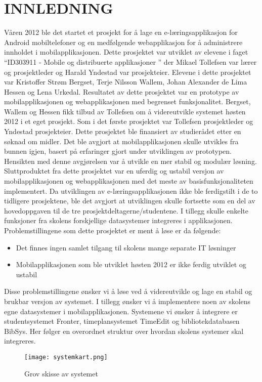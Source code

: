 \documentclass[../main.tex]{subfiles}
\begin{document}
\chapter{INNLEDNING}

Våren 2012 ble det startet et prosjekt for å lage en e-læringsapplikasjon for Android mobiltelefoner og en medfølgende webapplikasjon for å administrere innholdet i mobilapplikasjonen. Dette prosjektet var utviklet av elevene i faget “ID303911 - Mobile og distribuerte applikasjoner ” der Mikael Tollefsen var lærer og prosjektleder og Harald Yndestad var prosjekteier. Elevene i dette prosjektet var Kristoffer Strøm Bergset, Terje Nilsson Wallem, Johan Alexander de Lima Hessen og Lena Urkedal. Resultatet av dette prosjektet var en prototype av mobilapplikasjonen og webapplikasjonen med begrenset funksjonalitet.\newline
\newline
Bergset, Wallem og Hessen fikk tilbud av Tollefsen om å videreutvikle systemet høsten 2012 i et eget prosjekt. Som i det første prosjektet var Tollefsen prosjektleder og Yndestad prosjekteier. Dette prosjektet ble finansiert av studierådet etter en søknad om midler. Det ble avgjort at mobilapplikasjonen skulle utvikles fra bunnen igjen, basert på erfaringer gjort under utviklingen av prototypen. Hensikten med denne avgjørelsen var å utvikle en mer stabil og modulær løsning. Sluttproduktet fra dette prosjektet var en uferdig og ustabil versjon av mobilapplikasjonen og webapplikasjonen med det meste av basisfunksjonaliteten implementert.\newline
\newline
Da utviklingen av e-læringsapplikasjonen ikke ble ferdigstilt i de to tidligere prosjektene, ble det avgjort at utviklingen skulle fortsette som en del av hovedoppgaven til de tre prosjektdeltagerne/studentene. I tillegg skulle enkelte funksjoner fra skolens forskjellige datasystemer integreres i applikasjonen.\newline
Problemstillingene som dette prosjektet er ment å løse er da følgende:
\begin{itemize}
\item Det finnes ingen samlet tilgang til skolens mange separate IT løsninger
\item Mobilapplikasjonen som ble utviklet høsten 2012 er ikke ferdig utviklet og ustabil
\end{itemize}
Disse problemstillingene ønsker vi å løse ved å videreutvikle og lage en stabil og brukbar versjon av systemet. I tillegg ønsker vi å implementere noen av skolens egne datasystemer i mobilapplikasjonen. Systemene vi ønsker å integrere er studentsystemet Fronter, timeplansystemet TimeEdit og bibliotekdatabasen BibSys. Her følger en overordnet struktur over hvordan skolens systemer skal integreres.
\begin{figure}[H]
  \centering
  \texttt{[image: systemkart.png]}
  \caption{Grov skisse av systemet}
\end{figure}
\end{document}
